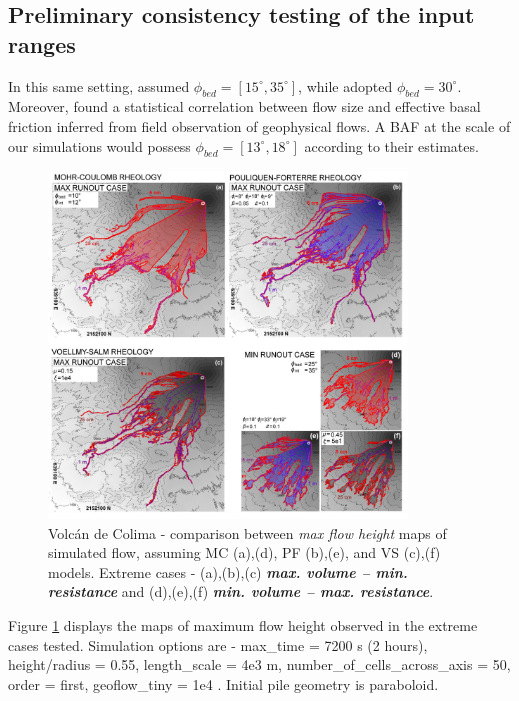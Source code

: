 \documentclass{article}
\begin{document}
\subsection{Preliminary consistency testing of the input ranges}
In this same setting, \cite{Dalbey2008} assumed $\phi_{bed}=[15^\mathrm{\circ}, 35^\mathrm{\circ}]$, while \citep{Capra2011} adopted $\phi_{bed}=30^\mathrm{\circ}$. Moreover, \cite{Spiller2014,Bayarri2015,Ogburn2016} found a statistical correlation between flow size and effective basal friction inferred from field observation of geophysical flows. A BAF at the scale of our simulations would possess $\phi_{bed}=[13^\mathrm{\circ}, 18^\mathrm{\circ}]$ according to their estimates.
\begin{figure}[H]
         \centering
        \includegraphics[width=0.85\textwidth]{Figures/ExtremeMaps.jpg}
        \caption{Volc\'an de Colima - comparison between \emph{max flow height} maps of simulated flow, assuming MC (a),(d), PF (b),(e), and VS (c),(f) models. Extreme cases - (a),(b),(c) \emph{\textbf{max. volume -- min. resistance}} and (d),(e),(f) \emph{\textbf{min. volume -- max. resistance}}.}
        \label{Colima-MaxMinExtents}
\end{figure}
Figure \ref{Colima-MaxMinExtents} displays the maps of maximum flow height observed in the extreme cases tested. Simulation options are - max\_time = 7200 s (2 hours), height/radius = 0.55, length\_scale = 4e3 m, number\_of\_cells\_across\_axis = 50, order = first, geoflow\_tiny = 1e4 \citep{Patra2005,Aghakhani2016}. Initial pile geometry is paraboloid. 
\end{document}
